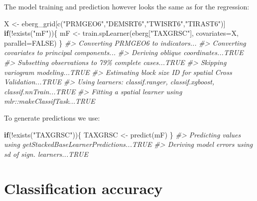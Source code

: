 \documentclass[
  graybox,natbib,nospthms]{svmono}
\newenvironment{Shaded}{\begin{snugshade}}{\end{snugshade}}
\newcommand{\AttributeTok}[1]{\textcolor[rgb]{0.61,0.61,0.61}{#1}}
\newcommand{\CommentTok}[1]{\textcolor[rgb]{0.37,0.37,0.37}{\textit{#1}}}
\newcommand{\ConstantTok}[1]{\textcolor[rgb]{0,0,0}{#1}}
\newcommand{\ControlFlowTok}[1]{\textcolor[rgb]{0.27,0.27,0.27}{\textbf{#1}}}
\newcommand{\FunctionTok}[1]{\textcolor[rgb]{0,0,0}{#1}}
\newcommand{\NormalTok}[1]{#1}
\newcommand{\OtherTok}[1]{\textcolor[rgb]{0.37,0.37,0.37}{#1}}
\newcommand{\SpecialCharTok}[1]{\textcolor[rgb]{0,0,0}{#1}}
\newcommand{\StringTok}[1]{\textcolor[rgb]{0.5,0.5,0.5}{#1}}
\begin{document}
The model training and prediction however looks the same as for the regression:

\begin{Shaded}
\begin{Highlighting}[]
\NormalTok{X }\OtherTok{\textless{}{-}}\NormalTok{ eberg\_grid[}\FunctionTok{c}\NormalTok{(}\StringTok{"PRMGEO6"}\NormalTok{,}\StringTok{"DEMSRT6"}\NormalTok{,}\StringTok{"TWISRT6"}\NormalTok{,}\StringTok{"TIRAST6"}\NormalTok{)]}
\ControlFlowTok{if}\NormalTok{(}\SpecialCharTok{!}\FunctionTok{exists}\NormalTok{(}\StringTok{"mF"}\NormalTok{))\{}
\NormalTok{  mF }\OtherTok{\textless{}{-}} \FunctionTok{train.spLearner}\NormalTok{(eberg[}\StringTok{"TAXGRSC"}\NormalTok{], }\AttributeTok{covariates=}\NormalTok{X, }\AttributeTok{parallel=}\ConstantTok{FALSE}\NormalTok{)}
\NormalTok{\}}
\CommentTok{\#\textgreater{} Converting PRMGEO6 to indicators...}
\CommentTok{\#\textgreater{} Converting covariates to principal components...}
\CommentTok{\#\textgreater{} Deriving oblique coordinates...TRUE}
\CommentTok{\#\textgreater{} Subsetting observations to 79\% complete cases...TRUE}
\CommentTok{\#\textgreater{} Skipping variogram modeling...TRUE}
\CommentTok{\#\textgreater{} Estimating block size ID for spatial Cross Validation...TRUE}
\CommentTok{\#\textgreater{} Using learners: classif.ranger, classif.xgboost, classif.nnTrain...TRUE}
\CommentTok{\#\textgreater{} Fitting a spatial learner using \textquotesingle{}mlr::makeClassifTask\textquotesingle{}...TRUE}
\end{Highlighting}
\end{Shaded}

To generate predictions we use:

\begin{Shaded}
\begin{Highlighting}[]
\ControlFlowTok{if}\NormalTok{(}\SpecialCharTok{!}\FunctionTok{exists}\NormalTok{(}\StringTok{"TAXGRSC"}\NormalTok{))\{}
\NormalTok{  TAXGRSC }\OtherTok{\textless{}{-}} \FunctionTok{predict}\NormalTok{(mF)}
\NormalTok{\}}
\CommentTok{\#\textgreater{} Predicting values using \textquotesingle{}getStackedBaseLearnerPredictions\textquotesingle{}...TRUE}
\CommentTok{\#\textgreater{} Deriving model errors using sd of sign. learners...TRUE}
\end{Highlighting}
\end{Shaded}

\hypertarget{classification-accuracy}{%
\section{Classification accuracy}\label{classification-accuracy}}
\end{document}
